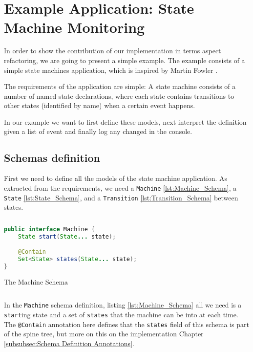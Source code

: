 
\chapter{Example Application: State Machine Monitoring}\label{Example Application}
In order to show the contribution of our implementation in terms aspect refactoring, we are going to present a simple example.
The example consists of a simple state machines application, which is inspired by Martin Fowler \cite{fowler2010domain}.

The requirements of the application are simple: A state machine consists of a number of named state declarations, where each state contains transitions to other states (identified by name) when a certain event happens.

In our example we want to first define these models, next interpret the definition given a list of event and finally log any changed in the console.

\section{Schemas definition}
First we need to define all the models of the state machine application. 
As extracted from the requirements, we need a \texttt{Machine} \ref{lst:Machine_Schema}, a \texttt{State} \ref{lst:State_Schema}, and a \texttt{Transition} \ref{lst:Transition_Schema} between states.

\begin{sourcecode}
	\begin{lstlisting}[language=Java,escapechar=|]
public interface Machine {
	State start(State... state);

	@Contain
	Set<State> states(State... state);
}
	\end{lstlisting}
	\caption{The Machine Schema}
	\label{lst:Machine_Schema}
\end{sourcecode}

In the \texttt{Machine} schema definition, listing \ref{lst:Machine_Schema} all we need is a \texttt{start}ing state and a set of \texttt{states} that the machine can be into at each time.
The \texttt{@Contain} annotation here defines that the \texttt{states} field of this schema is part of the spine tree, but more on this on the implementation Chapter \ref{subsubsec:Schema Definition Annotations}.

